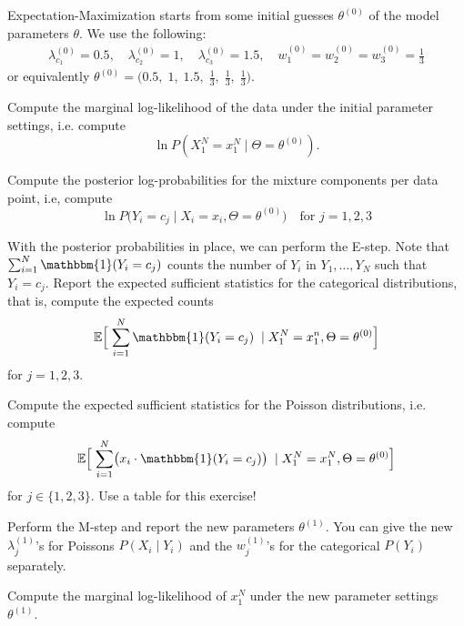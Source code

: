 \documentclass[a4paper,10pt,landscape,twocolumn]{scrartcl}
\newcommand{\Ind}[1]{\mathbbm{1}(#1)}
\begin{document}
\begin{exercise}
  Expectation-Maximization starts from some initial guesses $\theta^{(0)}$ of
  the model parameters $\theta$. We use the following:
  \begin{align*}
    \lambda_{c_1}^{(0)} = 0.5, 
      \quad \lambda_{c_2}^{(0)} = 1, 
      \quad \lambda_{c_3}^{(0)} = 1.5, 
      \quad w_1^{(0)} = w_2^{(0)} = w_3^{(0)} = \frac{1}{3}
  \end{align*}
  or equivalently  $\theta^{(0)} = \bigl(0.5,\; 1,\; 1.5, \; \frac{1}{3},\;
  \frac 1 3,\; \frac 1 3 \bigr)$.
  
  \begin{subex}[1pt]
    Compute the marginal log-likelihood of the data under the initial parameter
    settings, i.e. compute
    \[
      \ln P(X_1^N = x_1^N \mid \Theta = \theta^{(0)}).
    \]
  \end{subex}
	
  \begin{subex}[2pt]
    Compute the posterior log-probabilities for the mixture components per data
    point, i.e, compute
    \[
      \ln P\bigl(Y_i = c_j \mid X_i = x_i, \Theta = \theta^{(0)}\bigr) 
      \quad \text{for $j=1,2,3$}
	\]
  \end{subex}

  \begin{subex}[2pt]
    With the posterior probabilities in place, we can perform the E-step. Note
    that $\sum_{i=1}^N \Ind{Y_i = c_j}$ counts the number of $Y_i$ in 
    $Y_1, \dots, Y_N$ such that $Y_i = c_j$. Report the expected sufficient
    statistics for the categorical distributions, that is, compute the expected
    counts
    \[
      \mathbb E\Bigl[ \; \sum_{i=1}^N \Ind{Y_i = c_j} 
        \; \mid X_1^N = x_1^n, \Theta = \theta^{(0)} \Bigr]
    \]
    for $j = 1, 2, 3$.
  \end{subex}

  \begin{subex}[2pt]
    Compute the expected sufficient statistics for the Poisson distributions,
    i.e. compute
	\[
      \mathbb E\Bigl[\;\sum_{i=1}^N \bigl(x_i \cdot \Ind{Y_i = c_j}\bigr)
        \;\mid X_1^N = x_1^N, \Theta=\theta^{(0)}\Bigr]
	\]
	for $j\in \{1, 2, 3\}$. Use a table for this exercise!
  \end{subex}

  \begin{subex}[2pt]
    Perform the M-step and report the new parameters $\theta^{(1)}$. You can
    give the new $\lambda_j^{(1)}$'s for Poissons $P(X_i \mid Y_i)$ and the
    $w_j^{(1)}$'s for the categorical $ P(Y_i) $ separately.
  \end{subex}
	
  \begin{subex}[1pt]
    Compute the marginal log-likelihood of $ x_1^N $ under the new parameter
    settings $\theta^{(1)}$.
  \end{subex}
\end{exercise}
\end{document}

